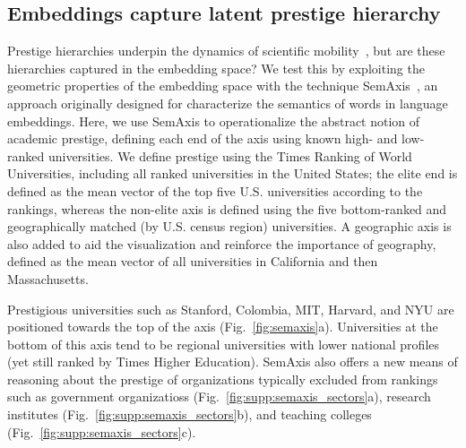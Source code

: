 \documentclass[12pt]{article} %
\begin{document}
%
%
\subsection*{Embeddings capture latent prestige hierarchy}

Prestige hierarchies underpin the dynamics of scientific mobility~\autocite{deville2014career, clauset2015hierarchy}, but are these hierarchies captured in the embedding space?
We test this by exploiting the geometric properties of the embedding space with the technique SemAxis~\autocite{an2018semaxis}, an approach originally designed for characterize the semantics of words in language embeddings.
Here, we use SemAxis to operationalize the abstract notion of academic prestige, defining each end of the axis using known high- and low-ranked universities. 
We define prestige using the Times Ranking of World Universities, including all ranked universities in the United States;
the elite end is defined as the mean vector of the top five U.S. universities according to the rankings, whereas the non-elite axis is defined using the five bottom-ranked and geographically matched (by U.S. census region) universities.
A geographic axis is also added to aid the visualization and reinforce the importance of geography, defined as the mean vector of all universities in California and then Massachusetts. 

Prestigious universities such as Stanford, Colombia, MIT, Harvard, and NYU are positioned towards the top of the axis (Fig.~\ref{fig:semaxis}a).
Universities at the bottom of this axis tend to be regional universities with lower national profiles (yet still ranked by Times Higher Education).
SemAxis also offers a new means of reasoning about the prestige of organizations typically excluded from rankings such as government organizatioss (Fig.~\ref{fig:supp:semaxis_sectors}a), research institutes (Fig.~\ref{fig:supp:semaxis_sectors}b), and teaching colleges (Fig.~\ref{fig:supp:semaxis_sectors}c).
\end{document}
